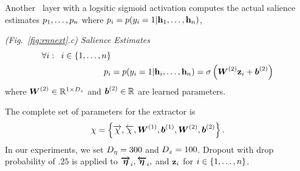 Another \feedforward~layer
with a logsitic sigmoid activation computes the actual salience 
estimates $p_1,\ldots,p_n$ where $p_i = p(y_i=1|\mathbf{h}_1,\ldots,\mathbf{h}_n)$,

\vspace{10pt}\noindent\textit{(Fig.~\ref{fig:rnnext}.c) Salience Estimates}
\begin{align}
    \forall i : \;\; i \in \{1,\ldots,n\}& \nonumber \\
    p_i &= p(y_i=1|\mathbf{h}_i,\ldots,\mathbf{h}_n) = \sigma\left(\boldsymbol{W}^{(2)}\mathbf{z}_i + \boldsymbol{b}^{(2)}  \right)
\end{align}
where $\boldsymbol{W}^{(2)} \in \mathbb{R}^{1 \times {D_z}}$
and $\boldsymbol{b}^{(2)} \in \mathbb{R}$ are learned parameters.

The complete set of parameters for the extractor is 
\[ \chi = \left\{\overrightarrow{\chi}, \overleftarrow{\chi}, \boldsymbol{W}^{(1)}, \boldsymbol{b}^{(1)}, \boldsymbol{W}^{(2)}, \boldsymbol{b}^{(2)} \right\}.\]
In our experiments, we set ${D_\eta}=300$ and ${D_z}=100$.
Dropout with drop probability of $.25$ is applied to $\boldsymbol{\overrightarrow{\eta}}_i, \boldsymbol{\overleftarrow{\eta}}_i,$ and $\mathbf{z}_i$ for $i \in \{1,\ldots,n\}$.

\FloatBarrier


